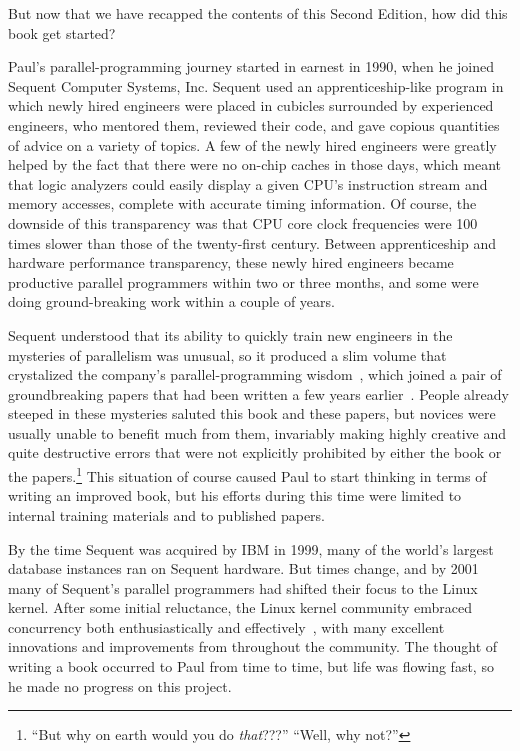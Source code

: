 But now that we have recapped the contents of this Second Edition, how did
this book get started?

Paul's parallel-programming journey started in earnest in 1990, when
he joined Sequent Computer Systems, Inc.
Sequent used an apprenticeship-like program in which newly hired engineers
were placed in cubicles surrounded by experienced engineers, who mentored
them, reviewed their code, and gave copious quantities of advice on
a variety of topics.
A few of the newly hired engineers were greatly helped by the fact that
there were no on-chip caches in those days, which meant that
logic analyzers could easily display a given CPU's instruction stream
and memory accesses, complete with accurate timing information.
Of course, the downside of this transparency was that CPU core clock
frequencies were 100 times slower than those of the twenty-first
century.
Between apprenticeship and hardware performance transparency, these newly
hired engineers became productive parallel programmers within two or three
months, and some were doing ground-breaking work within a couple of years.

Sequent understood that its ability to quickly train new engineers in the
mysteries of parallelism was unusual, so it produced a slim volume that
crystalized the company's parallel-programming wisdom~\cite{SQNTParallel},
which joined a pair of groundbreaking papers that had been written a
few years earlier~\cite{Beck85,Inman85}.
People already steeped in these mysteries saluted this book and these
papers, but novices were usually unable to benefit much from them,
invariably making highly creative and quite destructive errors that
were not explicitly prohibited by either the book or the papers.\footnote{
	``But why on earth would you do \emph{that}???''
	``Well, why not?''}
This situation of course caused Paul to start thinking in terms of
writing an improved book, but his efforts during this time were limited
to internal training materials and to published papers.

By the time Sequent was acquired by IBM in 1999, many of the world's
largest database instances ran on Sequent hardware.
But times change, and by 2001 many of Sequent's parallel programmers
had shifted their focus to the Linux kernel.
After some initial reluctance, the Linux kernel community embraced
concurrency both enthusiastically and
effectively~\cite{SilasBoydWickizer2010LinuxScales48,McKenney:2012:BEP:2414729.2414734},
with many excellent innovations and improvements from throughout the
community.
The thought of writing a book occurred to Paul from time to time, but
life was flowing fast, so he made no progress on this project.

